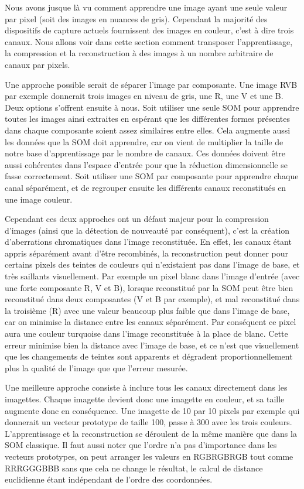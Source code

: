 	Nous avons jusque là vu comment apprendre une image ayant une seule valeur par pixel (soit des images en nuances de gris). Cependant la majorité des dispositifs de capture actuels fournissent des images en couleur, c'est à dire trois canaux. Nous allons voir dans cette section comment transposer l'apprentissage, la compression et la reconstruction à des images à un nombre arbitraire de canaux par pixels.

	Une approche possible serait de séparer l'image par composante. Une image RVB par exemple donnerait trois images en niveau de gris, une R, une V et une B. Deux options s'offrent ensuite à nous. Soit utiliser une seule SOM pour apprendre toutes les images ainsi extraites en espérant que les différentes formes présentes dans chaque composante soient assez similaires entre elles. Cela augmente aussi les données que la SOM doit apprendre, car on vient de multiplier la taille de notre base d'apprentissage par le nombre de canaux. Ces données doivent être aussi cohérentes dans l'espace d'entrée pour que la réduction dimensionnelle se fasse correctement. Soit utiliser une SOM par composante pour apprendre chaque canal séparément, et de regrouper ensuite les différents canaux reconstitués en une image couleur. 
	
	Cependant ces deux approches ont un défaut majeur pour la compression d'images (ainsi que la détection de nouveauté par conséquent), c'est la création d'aberrations chromatiques dans l'image reconstituée. En effet, les canaux étant appris séparément avant d'être recombinés, la reconstruction peut donner pour certains pixels des teintes de couleurs qui n'existaient pas dans l'image de base, et très saillants visuellement. Par exemple un pixel blanc dans l'image d'entrée (avec une forte composante R, V et B), lorsque reconstitué par la SOM peut être bien reconstitué dans deux composantes (V et B par exemple), et mal reconstitué dans la troisième (R) avec une valeur beaucoup plus faible que dans l'image de base, car on minimise la distance entre les canaux séparément. Par conséquent ce pixel aura une couleur turquoise dans l'image reconstituée à la place de blanc. Cette erreur minimise bien la distance avec l'image de base, et ce n'est que visuellement que les changements de teintes sont apparents et dégradent proportionnellement plus la qualité de l'image que que l'erreur mesurée.

	Une meilleure approche consiste à inclure tous les canaux directement dans les imagettes. Chaque imagette devient donc une imagette en couleur, et sa taille augmente donc en conséquence. Une imagette de 10 par 10 pixels par exemple qui donnerait un vecteur prototype de taille 100, passe à 300 avec les trois couleurs. L'apprentissage et la reconstruction se déroulent de la même manière que dans la SOM classique. Il faut aussi noter que l'ordre n'a pas d'importance dans les vecteurs prototypes, on peut arranger les valeurs en RGBRGBRGB tout comme RRRGGGBBB sans que cela ne change le résultat, le calcul de distance euclidienne étant indépendant de l'ordre des coordonnées.

